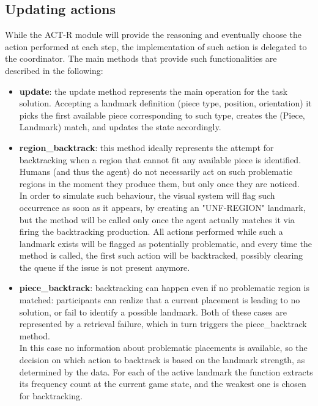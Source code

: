 \documentclass[a4paper,singleside,12pt]{report} %
\begin{document}
    \subsection{Updating actions}
    While the ACT-R module will provide the reasoning and eventually choose the action performed at each step, the implementation of such action is delegated to the coordinator. The main methods that provide such functionalities are described in the following:
    \begin{itemize}
        \item \textbf{update}: the update method represents the main operation for the task solution. Accepting a landmark definition (piece type, position, orientation) it picks the first available piece corresponding to such type, creates the (Piece, Landmark) match, and updates the state accordingly.
        \item \textbf{region\_backtrack}: this method ideally represents the attempt for backtracking when a region that cannot fit any available piece is identified. Humans (and thus the agent) do not necessarily act on such problematic regions in the moment they produce them, but only once they are noticed. 
        \\In order to simulate such behaviour, the visual system will flag such occurrence as soon as it appears, by creating an "UNF-REGION" landmark, but the method will be called only once the agent actually matches it via firing the backtracking production. All actions performed while such a landmark exists will be flagged as potentially problematic, and every time the method is called, the first such action will be backtracked, possibly clearing the queue if the issue is not present anymore.
        \item \textbf{piece\_backtrack}: backtracking can happen even if no problematic region is matched: participants can realize that a current placement is leading to no solution, or fail to identify a possible landmark. Both of these cases are represented by a retrieval failure, which in turn triggers the piece\_backtrack method. 
        \\In this case no information about problematic placements is available, so the decision on which action to backtrack is based on the landmark strength, as determined by the data. For each of the active landmark the function extracts its frequency count at the current game state, and the weakest one is chosen for backtracking.
    \end{itemize}
    
\end{document}
